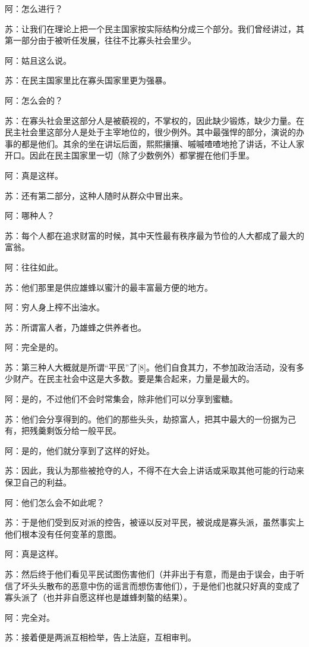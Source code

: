 \documentclass[12pt,oneside]{book}
\begin{document}
阿：怎么进行？

苏：让我们在理论上把一个民主国家按实际结构分成三个部分。我们曾经讲过，其第一部分由于被听任发展，往往不比寡头社会里少。

阿：姑且这么说。

苏：在民主国家里比在寡头国家里更为强暴。

阿：怎么会的？

苏：在寡头社会里这部分人是被藐视的，不掌权的，因此缺少锻炼，缺少力量。在民主社会里这部分人是处于主宰地位的，很少例外。其中最强悍的部分，演说的办事的都是他们。其余的坐在讲坛后面，熙熙攘攘、嘁嘁喳喳地抢了讲话，不让人家开口。因此在民主国家里一切（除了少数例外）都掌握在他们手里。

阿：真是这样。

苏：还有第二部分，这种人随时从群众中冒出来。

阿：哪种人？

苏：每个人都在追求财富的时候，其中天性最有秩序最为节俭的人大都成了最大的富翁。

阿：往往如此。

苏：他们那里是供应雄蜂以蜜汁的最丰富最方便的地方。

阿：穷人身上榨不出油水。

苏：所谓富人者，乃雄蜂之供养者也。

阿：完全是的。

苏：第三种人大概就是所谓“平民”了[8]。他们自食其力，不参加政治活动，没有多少财产。在民主社会中这是大多数。要是集合起来，力量是最大的。

阿：是的，不过他们不会时常集会，除非他们可以分享到蜜糖。

苏：他们会分享得到的。他们的那些头头，劫掠富人，把其中最大的一份据为己有，把残羹剩饭分给一般平民。

阿：是的，他们就分享到了这样的好处。

苏：因此，我认为那些被抢夺的人，不得不在大会上讲话或采取其他可能的行动来保卫自己的利益。

阿：他们怎么会不如此呢？

苏：于是他们受到反对派的控告，被诬以反对平民，被说成是寡头派，虽然事实上他们根本没有任何变革的意图。

阿：真是这样。

苏：然后终于他们看见平民试图伤害他们（并非出于有意，而是由于误会，由于听信了坏头头散布的恶意中伤的谣言而想伤害他们），于是他们也就只好真的变成了寡头派了（也并非自愿这样也是雄蜂刺螯的结果）。

阿：完全对。

苏：接着便是两派互相检举，告上法庭，互相审判。
\end{document}
